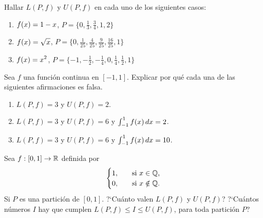 \item Hallar $L(P,f)$ y $U(P,f)$ en cada uno de los siguientes casos:
\begin{enumerate}
  \item $\displaystyle f(x) = 1-x$, $P=\{0, \frac13, \frac34, 1, 2\}$
  \item $\displaystyle f(x) = \sqrt{x}$, $P=\{0, \frac1{25}, \frac4{25}, \frac9{25}, \frac{16}{25}, 1\}$
  \item $\displaystyle f(x) = x^2$, $P=\{-1,-\frac12, -\frac14, 0, \frac14, \frac12, 1\}$
\end{enumerate}

\item Sea $f$ una función continua en $[-1,1]$. Explicar por qué cada una de las siguientes afirmaciones es falsa.
\begin{enumerate}
  \item $L(P,f)=3$ y $U(P,f)=2$.
  \item $L(P,f)=3$ y $U(P,f)=6$ y $\int_{-1}^1 f(x)\,dx=2$.
  \item $L(P,f)=3$ y $U(P,f)=6$ y $\int_{-1}^1 f(x)\,dx=10$.
\end{enumerate}

\item Sea $f:[0,1]\to \mathbb{R}$ definida por
\[
\begin{cases}
  1, \quad&\text{si $x\in\mathbb{Q}$,}
 \\ 
 0, \quad&\text{si $x\notin\mathbb{Q}$.}
\end{cases}
\]
Si $P$ es una partición de $[0,1]$.
?`Cuánto valen $L(P,f)$ y $U(P,f)$?
?`Cuántos números $I$ hay que cumplen $L(P,f) \le I \le U(P,f)$, para toda partición $P$?